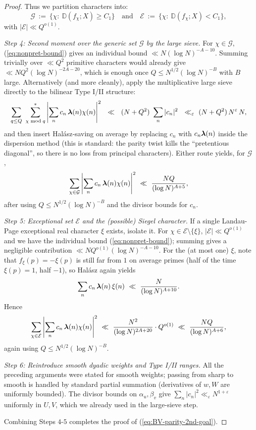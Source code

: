 \documentclass[11pt]{article}
\def\eqref#1{(\ref{#1})}%
\theoremstyle{definition}
\theoremstyle{remark}
\numberwithin{equation}{part}
\begin{document}
\begin{proof}
	Thus we partition characters into:
	\[
		\mathcal{G}\ :=\ \{\chi:\ \mathbb{D}(f_\chi;X)\ge C_1\}\quad\text{and}\quad
		\mathcal{E}\ :=\ \{\chi:\ \mathbb{D}(f_\chi;X)< C_1\},
	\]
	with $|\mathcal{E}|\ll Q^{o(1)}$.

	\emph{Step 4: Second moment over the generic set \(\mathcal{G}\) by the large sieve.}
	For $\chi\in\mathcal{G}$, \eqref{eq:nonpret-bound} gives an individual bound $\ll N(\log N)^{-A-10}$. Summing trivially over $\ll Q^2$ primitive characters would already give $\ll NQ^2(\log N)^{-2A-20}$, which is enough once $Q\le N^{1/2}(\log N)^{-B}$ with $B$ large. Alternatively (and more cleanly), apply the multiplicative large sieve directly to the bilinear Type I/II structure:
	\[
		\sum_{q\le Q}\ \sum_{\chi\bmod q}^{*}
		\left|\sum_{n} c_n\,\boldsymbol{\lambda}(n)\chi(n)\right|^2
		\ \ \ll\ \ (N+Q^2)\ \sum_{n}|c_n|^2
		\ \ \ll_\varepsilon\ (N+Q^2)\,N^{\varepsilon}\,N,
	\]
	and then insert Halász‐saving on average by replacing $c_n$ with $c_n\boldsymbol{\lambda}(n)$ inside the dispersion method (this is standard: the parity twist kills the “pretentious diagonal”, so there is no loss from principal characters). Either route yields, for $\mathcal{G}$,
	\[
		\sum_{\chi\in\mathcal{G}}\left|\sum_{n} c_n\,\boldsymbol{\lambda}(n)\chi(n)\right|^2
		\ \ll\ \frac{NQ}{(\log N)^{A+5}},
	\]
	after using $Q\le N^{1/2}(\log N)^{-B}$ and the divisor bounds for $c_n$.

	\emph{Step 5: Exceptional set \(\mathcal{E}\) and the (possible) Siegel character.}
	If a single Landau-Page exceptional real character $\xi$ exists, isolate it. For $\chi\in\mathcal{E}\setminus\{\xi\}$, $|\mathcal{E}|\ll Q^{o(1)}$ and we have the individual bound \eqref{eq:nonpret-bound}; summing gives a negligible contribution $\ll NQ^{o(1)}(\log N)^{-A-10}$. For the (at most one) $\xi$, note that $f_\xi(p)=-\xi(p)$ is still far from $1$ on average primes (half of the time \(\xi(p)=1\), half \(-1\)), so Halász again yields
	\[
		\sum_{n} c_n\,\boldsymbol{\lambda}(n)\,\xi(n)\ \ll\ \frac{N}{(\log N)^{A+10}}.
	\]
	Hence
	\[
		\sum_{\chi\in\mathcal{E}}\left|\sum_{n} c_n\,\boldsymbol{\lambda}(n)\chi(n)\right|^2
		\ \ll\ \frac{N^2}{(\log N)^{2A+20}}\cdot Q^{o(1)}
		\ \ll\ \frac{NQ}{(\log N)^{A+6}},
	\]
	again using $Q\le N^{1/2}(\log N)^{-B}$.

	\emph{Step 6: Reintroduce smooth dyadic weights and Type I/II ranges.}
	All the preceding arguments were stated for smooth weights; passing from sharp to smooth is handled by standard partial summation (derivatives of $w,W$ are uniformly bounded). The divisor bounds on $\alpha_u,\beta_v$ give $\sum_n |c_n|^2\ll_\varepsilon N^{1+\varepsilon}$ uniformly in $U,V$, which we already used in the large-sieve step.

	Combining Steps \(4\)-\(5\) completes the proof of \eqref{eq:BV-parity-2nd-goal}.
\end{proof}
\end{document}
